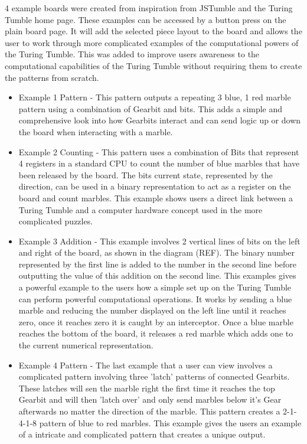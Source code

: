 \documentclass{l4proj}
\begin{document}
4 example boards were created from inspiration from JSTumble and the Turing Tumble home page. These examples can be accessed by a button press on the plain board page. It will add the selected piece layout to the board and allows the user to work through more complicated examples of the computational powers of the Turing Tumble. This was added to improve users awareness to the computational capabilities of the Turing Tumble without requiring them to create the patterns from scratch. 
\begin{itemize}
    \item Example 1 Pattern - This pattern outputs a repeating 3 blue, 1 red marble pattern using a combination of Gearbit and bits. This adds a simple and comprehensive look into how Gearbits interact and can send logic up or down the board when interacting with a marble.
    \item Example 2 Counting - This pattern uses a combination of Bits that represent 4 registers in a standard CPU to count the number of blue marbles that have been released by the board. The bits current state, represented by the direction, can be used in a binary representation to act as a register on the board and count marbles. This example shows users a direct link between a Turing Tumble and a computer hardware concept used in the more complicated puzzles.
    \item Example 3 Addition - This example involves 2 vertical lines of bits on the left and right of the board, as shown in the diagram (REF). The binary number represented by the first line is added to the number in the second line before outputting the value of this addition on the second line. This examples gives a powerful example to the users how a simple set up on the Turing Tumble can perform powerful computational operations. It works by sending a blue marble and reducing the number displayed on the left line until it reaches zero, once it reaches zero it is caught by an interceptor. Once a blue marble reaches the bottom of the board, it releases a red marble which adds one to the current numerical representation.
    \item  Example 4 Pattern - The last example that a user can view involves a complicated pattern involving three 'latch' patterns of connected Gearbits. These latches will sen the marble right the first time it reaches the top Gearbit and will then 'latch over' and only send marbles below it's Gear afterwards no matter the direction of the marble. This pattern creates a 2-1-4-1-8 pattern of blue to red marbles. This example gives the users an example of a intricate and complicated pattern that creates a unique output. 
\end{itemize}
\end{document}

